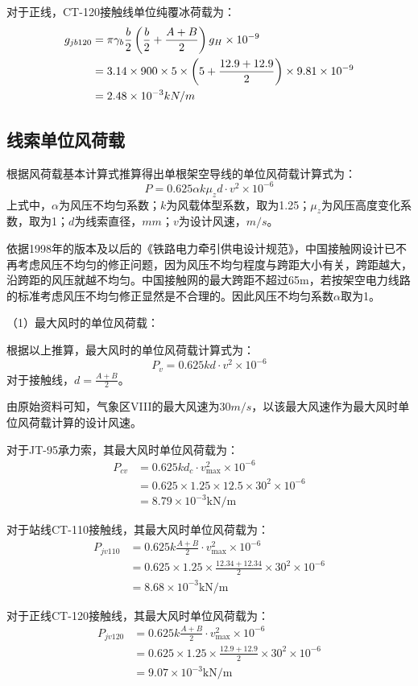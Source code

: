 对于正线，CT-120接触线单位纯覆冰荷载为：
\begin{align}
g_{jb120}&=\pi \gamma _b\frac{b}{2}\left( \frac{b}{2}+\frac{A+B}{2} \right) g_H\times 10^{-9}\notag
\\
&=3.14\times 900\times 5\times \left( 5+\frac{12.9+12.9}{2} \right) \times 9.81\times 10^{-9}\notag
\\
&=2.48\times 10^{-3}kN/m\notag
\end{align}


\subsection{线索单位风荷载}
根据风荷载基本计算式推算得出单根架空导线的单位风荷载计算式为：
$$
P=0.625\alpha k\mu _zd\cdot v^2\times 10^{-6}
$$
上式中，$\alpha $为风压不均匀系数；$k$为风载体型系数，取为1.25；$\mu_z$为风压高度变化系数，取为1；$d$为线索直径，$mm$；$v$为设计风速，$m/s$。

依据1998年的版本及以后的《铁路电力牵引供电设计规范》，中国接触网设计已不再考虑风压不均匀的修正问题，因为风压不均匀程度与跨距大小有关，跨距越大，沿跨距的风压就越不均匀。中国接触网的最大跨距不超过65m，若按架空电力线路的标准考虑风压不均匀修正显然是不合理的。因此风压不均匀系数$\alpha$取为1。

（1）最大风时的单位风荷载：

根据以上推算，最大风时的单位风荷载计算式为：
$$
P_v=0.625kd\cdot v^2\times 10^{-6}
$$
对于接触线，$d=\frac{A+B}{2}$。

由原始资料可知，气象区VIII的最大风速为30$m/s$，以该最大风速作为最大风时单位风荷载计算的设计风速。

对于JT-95承力索，其最大风时单位风荷载为：
\begin{align*}
	P_{cv} &= 0.625kd_c\cdot v_{\max}^{2}\times 10^{-6} \\
	&= 0.625\times 1.25\times 12.5\times 30^2\times 10^{-6} \\
	&= 8.79\times 10^{-3} \text{kN/m}
\end{align*}

对于站线CT-110接触线，其最大风时单位风荷载为：
\begin{align*}
	P_{jv110} &= 0.625k\frac{A+B}{2}\cdot v_{\max}^{2}\times 10^{-6} \\
	&= 0.625\times 1.25\times \frac{12.34+12.34}{2}\times 30^2\times 10^{-6} \\
	&= 8.68\times 10^{-3} \text{kN/m}
\end{align*}

对于正线CT-120接触线，其最大风时单位风荷载为：
\begin{align*}
	P_{jv120} &= 0.625k\frac{A+B}{2}\cdot v_{\max}^{2}\times 10^{-6} \\
	&= 0.625\times 1.25\times \frac{12.9+12.9}{2}\times 30^2\times 10^{-6} \\
	&= 9.07\times 10^{-3} \text{kN/m}
\end{align*}

